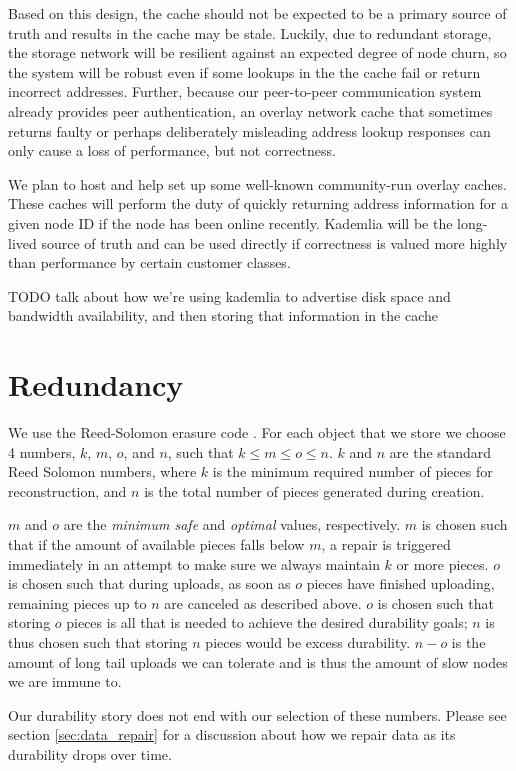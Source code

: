 \documentclass[11pt,fleqn,openany]{book}
\newcommand{\todo}[1]{{\color{red} TODO #1 }}
\begin{document}
Based on this design, the cache should not be expected to be a primary source
of truth and results in the cache may be stale. Luckily, due to redundant
storage, the storage network will be resilient against an expected degree of
node churn, so the system will be robust even if some lookups in the the cache
fail or return incorrect addresses.
Further, because our peer-to-peer communication
system already provides peer authentication, an overlay network cache that
sometimes returns faulty
or perhaps deliberately misleading address lookup responses can only cause a
loss of performance, but not correctness.

We plan to host and help set up some well-known community-run overlay caches.
These caches will perform the duty of quickly returning address information
for a given node ID if the node has been online recently. Kademlia will be the
long-lived source of truth and can be used directly if correctness is valued
more highly than performance by certain customer classes.

\todo{talk about how we're using kademlia to advertise disk space and bandwidth
availability, and then storing that information in the cache}

\section{Redundancy}

We use the Reed-Solomon erasure code \cite{rs}. For each object that we store
we choose 4 numbers, $k$, $m$, $o$, and $n$, such that $k\le m\le o\le n$.
$k$ and $n$ are the standard Reed Solomon numbers, where $k$ is the minimum
required number of pieces for reconstruction, and $n$ is the total number of
pieces generated during creation.

$m$ and $o$ are the {\em minimum safe} and {\em optimal} values, respectively.
$m$ is chosen such that if the amount of available pieces falls below $m$, a
repair is triggered immediately in an attempt to make sure we always maintain
$k$ or more pieces. $o$ is chosen such that during uploads, as soon as $o$
pieces have finished uploading, remaining pieces up to $n$ are canceled as
described above. $o$ is chosen such that storing $o$ pieces is all that is
needed to achieve the desired durability goals; $n$ is thus chosen such that
storing $n$ pieces would be excess durability. $n-o$ is the amount of long
tail uploads we can tolerate and is thus the amount of slow nodes we are immune
to.

Our durability story does not end with our selection of these numbers.
Please see section \ref{sec:data_repair} for a discussion about how we repair
data as its durability drops over time.
\end{document}
